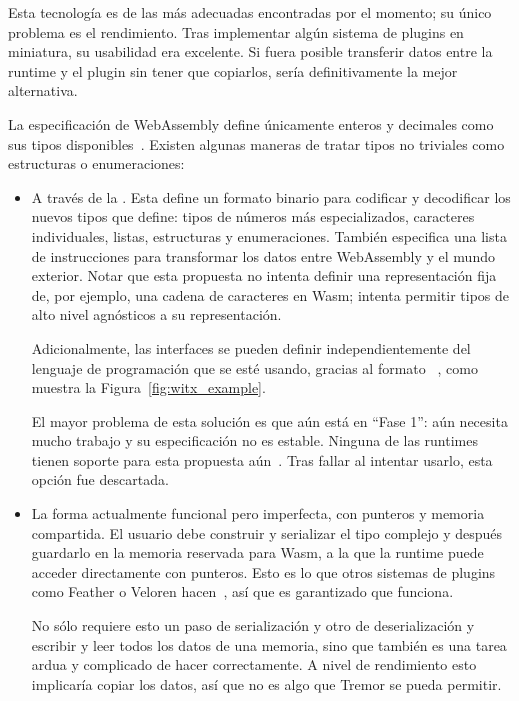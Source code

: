 Esta tecnología es de las más adecuadas encontradas por el momento; su único
problema es el rendimiento. Tras implementar algún sistema de plugins en
miniatura, su usabilidad era excelente. Si fuera posible transferir datos entre
la runtime y el plugin sin tener que copiarlos, sería definitivamente la mejor
alternativa.

La especificación de WebAssembly define únicamente enteros y decimales como sus
tipos disponibles~\cite{wasmertypes}. Existen algunas maneras de tratar tipos no
triviales como estructuras o enumeraciones:

\begin{itemize}
    \item A través de la \textcite{wasminterfacetypes}. Esta define un formato
        binario para codificar y decodificar los nuevos tipos que define: tipos
        de números más especializados, caracteres individuales, listas,
        estructuras y enumeraciones. También especifica una lista de
        instrucciones para transformar los datos entre WebAssembly y el mundo
        exterior. Notar que esta propuesta no intenta definir una representación
        fija de, por ejemplo, una cadena de caracteres en Wasm; intenta permitir
        tipos de alto nivel agnósticos a su representación.

        Adicionalmente, las interfaces se pueden definir independientemente del
        lenguaje de programación que se esté usando, gracias al formato
        ~\cite{witx}, como muestra la Figura~\ref{fig:witx_example}.

        El mayor problema de esta solución es que aún está en ``Fase 1'': aún
        necesita mucho trabajo y su especificación no es estable. Ninguna de las
        runtimes tienen soporte para esta propuesta
        aún~\cite{interfacetypeswasmtime}\cite{interfacetypeswasmer}. Tras
        fallar al intentar usarlo, esta opción fue descartada.

    \item La forma actualmente funcional pero imperfecta, con punteros y memoria
        compartida. El usuario debe construir y serializar el tipo complejo y
        después guardarlo en la memoria reservada para Wasm, a la que la runtime
        puede acceder directamente con punteros. Esto es lo que otros sistemas
        de plugins como Feather o Veloren
        hacen~\cite{featherpluginsystem}\cite{velorenpluginsystem}, así que es
        garantizado que funciona.

        No sólo requiere esto un paso de serialización y otro de deserialización
        y escribir y leer todos los datos de una memoria, sino que también es
        una tarea ardua y complicado de hacer correctamente. A nivel de
        rendimiento esto implicaría copiar los datos, así que no es algo que
        Tremor se pueda permitir.


\end{itemize}
